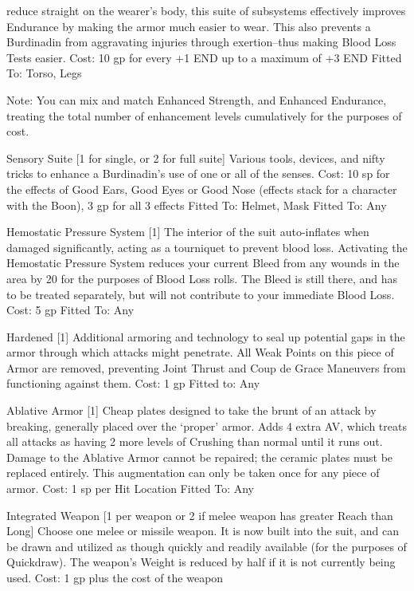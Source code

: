 \documentclass[oneside,11pt,english]{book}
\begin{document}
reduce straight on the wearer’s body, this suite of subsystems effectively improves Endurance by making 
the armor much easier to wear. This also prevents a Burdinadin from aggravating injuries through 
exertion--thus making Blood Loss Tests easier. 
Cost: 10 gp for every +1 END up to a maximum of +3 END 
Fitted To: Torso, Legs 

 

Note: You can mix and match Enhanced Strength, and Enhanced Endurance, treating the total number of 
enhancement levels cumulatively for the purposes of cost. 

 

Sensory Suite [1 for single, or 2 for full suite] 
Various tools, devices, and nifty tricks to enhance a Burdinadin’s use of one or all of the senses. 
Cost: 10 sp for the effects of Good Ears, Good Eyes or Good Nose (effects stack for a character with the 
Boon), 3 gp for all 3 effects 
Fitted To: Helmet, Mask 
Fitted To: Any 

 

Hemostatic Pressure System [1] 
The interior of the suit auto-inflates when damaged significantly, acting as a tourniquet to prevent blood 
loss. Activating the Hemostatic Pressure System reduces your current Bleed from any wounds in the area 
by 20 for the purposes of Blood Loss rolls. The Bleed is still there, and has to be treated separately, but 
will not contribute to your immediate Blood Loss. 
Cost: 5 gp 
Fitted To: Any 

 

Hardened [1] 
Additional armoring and technology to seal up potential gaps in the armor through which attacks might 
penetrate. All Weak Points on this piece of Armor are removed, preventing Joint Thrust and Coup de 
Grace Maneuvers from functioning against them. 
Cost: 1 gp 
Fitted to: Any 

 

Ablative Armor [1] 
Cheap plates designed to take the brunt of an attack by breaking, generally placed over the ‘proper’ 
armor. Adds 4 extra AV, which treats all attacks as having 2 more levels of Crushing than normal until it 
runs out. Damage to the Ablative Armor cannot be repaired; the ceramic plates must be replaced entirely. 
This augmentation can only be taken once for any piece of armor. 
Cost: 1 sp per Hit Location 
Fitted To: Any 

 

Integrated Weapon [1 per weapon or 2 if melee weapon has greater Reach than Long] 
Choose one melee or missile weapon. It is now built into the suit, and can be drawn and utilized as though 
quickly and readily available (for the purposes of Quickdraw). The weapon’s Weight is reduced by half if 
it is not currently being used. 
Cost: 1 gp plus the cost of the weapon 
\end{document}

